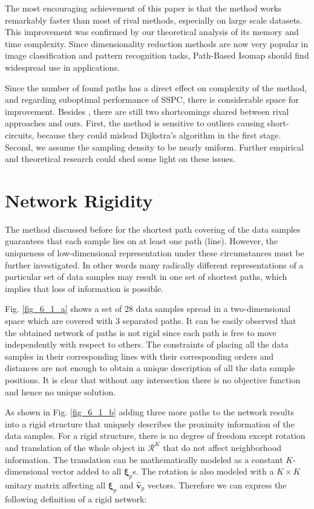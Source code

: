 \documentclass[10pt,journal,cspaper,compsoc]{IEEEtran}
\begin{document}
The most encouraging achievement of this paper is that the method works remarkably faster than most of rival methods, especially on large scale datasets. This improvement was confirmed by our theoretical analysis of its memory and time complexity. Since dimensionality reduction methods are now very popular in image classification and pattern recognition tasks, Path-Based Isomap should find widespread use in applications. 

Since the number of found paths has a direct effect on complexity of the method, and regarding suboptimal performance of SSPC, there is considerable space for improvement. Besides , there are still two shortcomings shared between rival approaches and ours. First, the method is sensitive to outliers causing short-circuits, because they could mislead Dijkstra's algorithm in the first stage. Second, we assume the sampling density to be nearly uniform. Further empirical and theoretical research could shed some light on these issues.









\appendices
\section{Network Rigidity}
The method discussed before for the shortest path covering of the data samples guarantees that each sample lies on at least one path (line). However, the uniqueness of low-dimensional representation under these circumstances must be further investigated. In other words many radically different representations of a particular set of data samples may result in one set of shortest paths, which implies that loss of information is possible. 

Fig. \ref{fig_6_1_a} shows a set of $28$ data samples spread in a two-dimensional space which are covered with $3$ separated paths. It can be easily observed that the obtained network of paths is not rigid since each path is free to move independently with respect to others. The constraints of placing all the data samples in their corresponding lines with their corresponding orders and distances are not enough to obtain a unique description of all the data sample positions. It is clear that without any intersection there is no objective function and hence no unique solution.

As shown in Fig. \ref{fig_6_1_b} adding three more paths to the network results into a rigid structure that uniquely describes the proximity information of the data samples. For a rigid structure, there is no degree of freedom except rotation and translation of the whole object in $\mathcal{R}^K$ that do not affect neighborhood information. The translation can be mathematically modeled as a constant $K$-dimensional vector added to all $\boldsymbol{\xi}_p$s. The rotation is also modeled with a $K\times K$ unitary matrix affecting all $\boldsymbol{\xi}_p$ and $\hat{\boldsymbol{v}}_p$ vectors. Therefore we can express the following definition of a rigid network:
\end{document}
